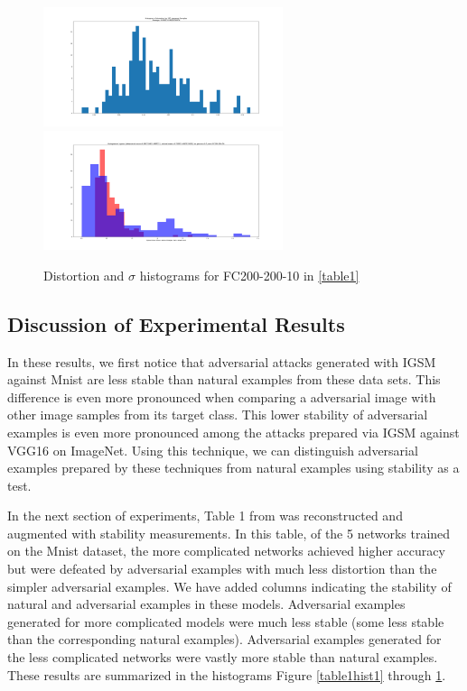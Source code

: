 \documentclass[10pt]{extarticle}
\newcounter{col}
\begin{document}
\begin{figure}[H]
\includegraphics[trim=200 80 100 100, clip,width=7cm]{2019-04-10-adverse/gamma_sigma/FC200-200-10-distortion_hist.png}\includegraphics[trim=200 80 100 100, clip,width=7cm]{2019-04-10-adverse/gamma_sigma/FC200-200-10-gamma1_hist.png}
\caption{Distortion and $\sigma$ histograms for FC200-200-10 in \ref{table1}}
\label{table1hist5}
\end{figure}

\subsection{Discussion of Experimental Results}
In these results, we first notice that adversarial attacks generated with IGSM against Mnist are less stable than natural examples from these data sets. This difference is even more pronounced when comparing a adversarial image with other image samples from its target class. This lower stability of adversarial examples is even more pronounced among the attacks prepared via IGSM against VGG16 on ImageNet. Using this technique, we can distinguish adversarial examples prepared by these techniques from natural examples using stability as a test. 

In the next section of experiments, Table 1 from \cite{Szegedy2013} was reconstructed and augmented with stability measurements. In this table, of the 5 networks trained on the Mnist dataset, the more complicated networks achieved higher accuracy but were defeated by adversarial examples with much less distortion than the simpler adversarial examples. We have added columns indicating the stability of natural and adversarial examples in these models. Adversarial examples generated for more complicated models were much less stable (some less stable than the corresponding natural examples). Adversarial examples generated for the less complicated networks were vastly more stable than natural examples. These results are summarized in the histograms Figure \ref{table1hist1} through \ref{table1hist5}. 
\end{document}
